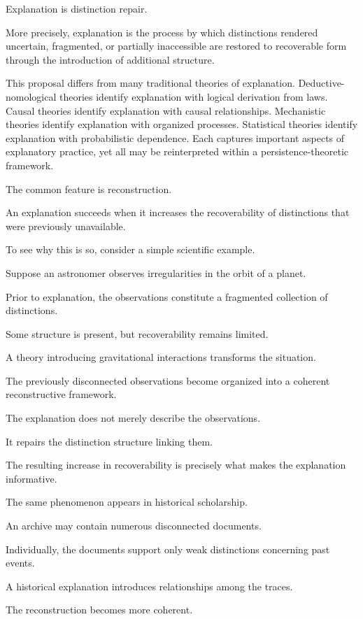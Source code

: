\documentclass[12pt,oneside]{article}
\theoremstyle{definition}
\begin{document}
Explanation is distinction repair.

More precisely, explanation is the process by which distinctions rendered uncertain, fragmented, or partially inaccessible are restored to recoverable form through the introduction of additional structure.

This proposal differs from many traditional theories of explanation. Deductive-nomological theories identify explanation with logical derivation from laws. Causal theories identify explanation with causal relationships. Mechanistic theories identify explanation with organized processes. Statistical theories identify explanation with probabilistic dependence. Each captures important aspects of explanatory practice, yet all may be reinterpreted within a persistence-theoretic framework.

The common feature is reconstruction.

An explanation succeeds when it increases the recoverability of distinctions that were previously unavailable.

To see why this is so, consider a simple scientific example.

Suppose an astronomer observes irregularities in the orbit of a planet.

Prior to explanation, the observations constitute a fragmented collection of distinctions.

Some structure is present, but recoverability remains limited.

A theory introducing gravitational interactions transforms the situation.

The previously disconnected observations become organized into a coherent reconstructive framework.

The explanation does not merely describe the observations.

It repairs the distinction structure linking them.

The resulting increase in recoverability is precisely what makes the explanation informative.

The same phenomenon appears in historical scholarship.

An archive may contain numerous disconnected documents.

Individually, the documents support only weak distinctions concerning past events.

A historical explanation introduces relationships among the traces.

The reconstruction becomes more coherent.
\end{document}
